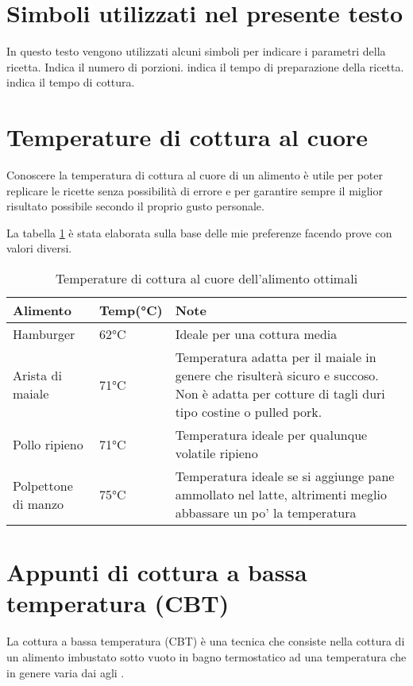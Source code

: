 \section{Simboli utilizzati nel presente testo}
In questo testo vengono utilizzati alcuni simboli per indicare i parametri della ricetta. \Fork\Dish\Knife \> Indica il numero di porzioni. \Gloves \> indica il tempo di preparazione della ricetta. \Gasstove \> indica il tempo di cottura.

\section{Temperature di cottura al cuore}
Conoscere la temperatura di cottura al cuore di un alimento è utile per poter replicare le ricette senza possibilità di errore e per garantire sempre il miglior risultato possibile secondo il proprio gusto personale.

La tabella \ref{temperature-al-cuore} è stata elaborata sulla base delle mie preferenze facendo prove con valori diversi.



\begin{table}
\begin{tabular}{llp{}}
\toprule
Alimento				&	Temp(°C)		&		Note		\\
\midrule
Hamburger			& 	62°C 		& Ideale per una cottura media\\
Arista di maiale	& 	71°C 		& Temperatura adatta per il maiale in genere che risulterà sicuro e succoso. Non è adatta per cotture di tagli duri tipo costine o pulled pork. \\
Pollo ripieno 		& 	71°C 		& Temperatura ideale per qualunque volatile ripieno\\
Polpettone di manzo	&	75°C 		& Temperatura ideale se si aggiunge pane ammollato nel latte, altrimenti meglio abbassare un po' la temperatura\\
\bottomrule
\end{tabular}
\label{temperature-al-cuore}
\caption{Temperature di cottura al cuore dell'alimento ottimali}
\end{table}

\section{Appunti di cottura a bassa temperatura (CBT)}
La cottura a bassa temperatura (CBT) è una tecnica che consiste nella cottura di un alimento imbustato sotto vuoto in bagno termostatico ad una temperatura che in genere varia dai  agli .

